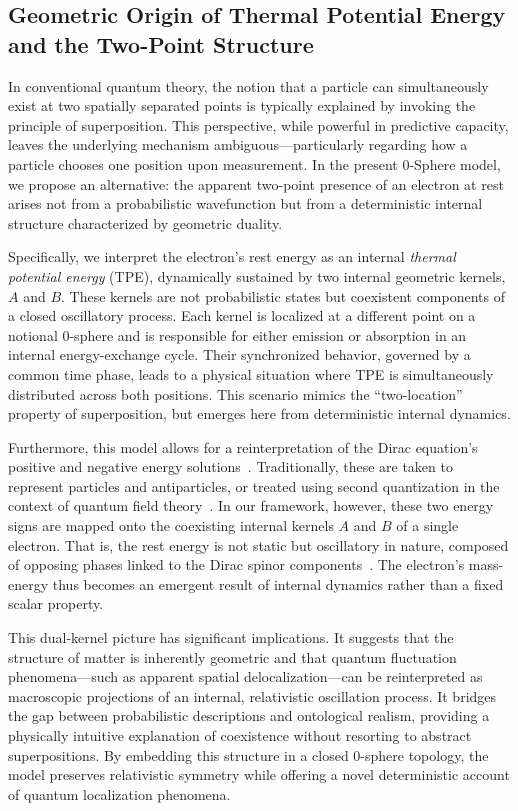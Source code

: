\documentclass[%
 reprint,
 amsmath,amssymb,
 aps,
]{revtex4-1}
\numberwithin{equation}{section}%
\begin{document}
\subsection{Geometric Origin of Thermal Potential Energy and the Two-Point Structure}

In conventional quantum theory, the notion that a particle can simultaneously exist at two spatially separated points is typically explained by invoking the principle of superposition. This perspective, while powerful in predictive capacity, leaves the underlying mechanism ambiguous—particularly regarding how a particle chooses one position upon measurement. In the present 0-Sphere model, we propose an alternative: the apparent two-point presence of an electron at rest arises not from a probabilistic wavefunction but from a deterministic internal structure characterized by geometric duality.

Specifically, we interpret the electron's rest energy as an internal \emph{thermal potential energy} (TPE), dynamically sustained by two internal geometric kernels, $A$ and $B$. These kernels are not probabilistic states but coexistent components of a closed oscillatory process. Each kernel is localized at a different point on a notional 0-sphere and is responsible for either emission or absorption in an internal energy-exchange cycle. Their synchronized behavior, governed by a common time phase, leads to a physical situation where TPE is simultaneously distributed across both positions. This scenario mimics the “two-location” property of superposition, but emerges here from deterministic internal dynamics.

Furthermore, this model allows for a reinterpretation of the Dirac equation's positive and negative energy solutions~\cite{bjorken1964}. Traditionally, these are taken to represent particles and antiparticles, or treated using second quantization in the context of quantum field theory~\cite{greiner2000}. In our framework, however, these two energy signs are mapped onto the coexisting internal kernels $A$ and $B$ of a single electron. That is, the rest energy is not static but oscillatory in nature, composed of opposing phases linked to the Dirac spinor components~\cite{bjorken1964}. The electron’s mass-energy thus becomes an emergent result of internal dynamics rather than a fixed scalar property.

This dual-kernel picture has significant implications. It suggests that the structure of matter is inherently geometric and that quantum fluctuation phenomena—such as apparent spatial delocalization—can be reinterpreted as macroscopic projections of an internal, relativistic oscillation process. It bridges the gap between probabilistic descriptions and ontological realism, providing a physically intuitive explanation of coexistence without resorting to abstract superpositions. By embedding this structure in a closed 0-sphere topology, the model preserves relativistic symmetry while offering a novel deterministic account of quantum localization phenomena.
\end{document}
